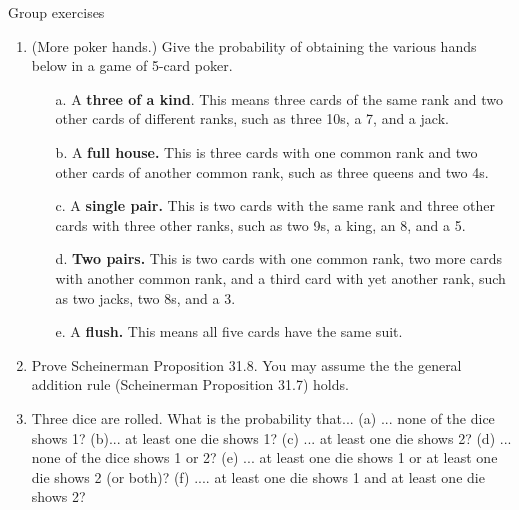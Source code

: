 \documentclass[10pt]{beamer}
\begin{document}
\begin{frame}{Group exercises}
\small
\begin{enumerate} \small
	\item (More poker hands.) Give the probability of obtaining the various hands below in a game of 5-card poker.
	\begin{itemize}	 \footnotesize 
	\item[a.] A \textbf{three of a kind}. This means three cards of the same rank and two other cards of different ranks, such as three 10s, a 7, and a jack.
	\item[b.] A \textbf{full house.} This is three cards with one common rank and two other cards of another common rank, such as three queens and two 4s.
	\item[c.] A \textbf{single pair.} This is two cards with the same rank and three other cards with three other ranks, such as two 9s, a king, an 8, and a 5.
	\item[d.] \textbf{Two pairs.} This is two cards with one common rank, two more cards with another common rank, and a third card with yet another rank, such as two jacks, two 8s, and a 3.
	\item[e.] A \textbf{flush.}  This means all five cards have the same suit.
	\end{itemize}
	\item Prove Scheinerman Proposition 31.8.   You may assume the the general addition rule (Scheinerman Proposition 31.7) holds.
	\item Three dice are rolled.  What is the probability that... (a) ... none of the dice shows 1? (b)... at least one die shows 1? (c) ... at least one die shows 2? (d) ... none of the dice shows 1 or 2? (e) ... at least one die shows 1 or at least one die shows 2 (or both)? (f) .... at least one die shows 1 and at least one die shows 2?
\end{enumerate}

\end{frame}
\end{document}

